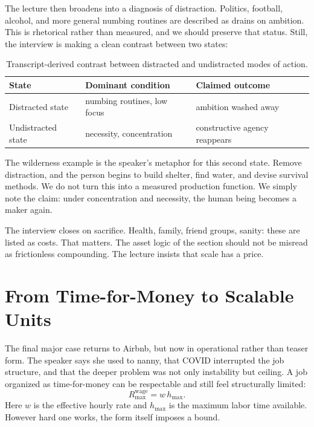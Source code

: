 The lecture then broadens into a diagnosis of distraction. Politics, football, alcohol, and more general numbing routines are described as drains on ambition. This is rhetorical rather than measured, and we should preserve that status. Still, the interview is making a clean contrast between two states:

\begin{table}[h]
\centering
\begin{tabular}{|l|l|l|}
\hline
State & Dominant condition & Claimed outcome \\
\hline
Distracted state & numbing routines, low focus & ambition washed away \\
Undistracted state & necessity, concentration & constructive agency reappears \\
\hline
\end{tabular}
\caption{Transcript-derived contrast between distracted and undistracted modes of action.}
\end{table}

The wilderness example is the speaker's metaphor for this second state. Remove distraction, and the person begins to build shelter, find water, and devise survival methods. We do not turn this into a measured production function. We simply note the claim: under concentration and necessity, the human being becomes a maker again.

The interview closes on sacrifice. Health, family, friend groups, sanity: these are listed as costs. That matters. The asset logic of the section should not be misread as frictionless compounding. The lecture insists that scale has a price.

\section{From Time-for-Money to Scalable Units}

The final major case returns to Airbnb, but now in operational rather than teaser form. The speaker says she used to nanny, that COVID interrupted the job structure, and that the deeper problem was not only instability but ceiling. A job organized as time-for-money can be respectable and still feel structurally limited:
\begin{equation}
R_{\max}^{\mathrm{wage}} = w\,h_{\max}.
\end{equation}
Here \(w\) is the effective hourly rate and \(h_{\max}\) is the maximum labor time available. However hard one works, the form itself imposes a bound.

